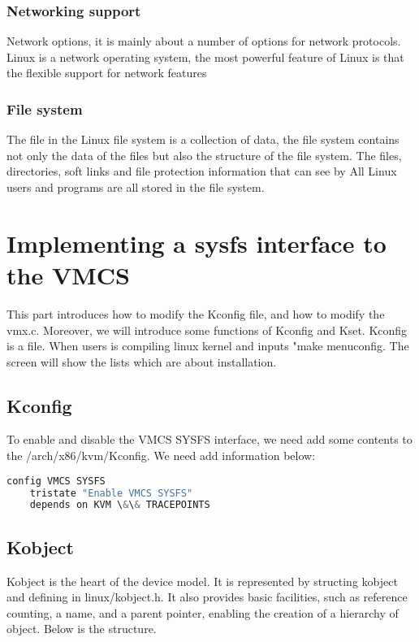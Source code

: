 \documentclass[10pt,draftclsnofoot,peerreview ,letterpaper,onecolumn,]{IEEEtran}
\begin{document}
	\subsubsection{Networking support}
	Network options, it is mainly about a number of options for network protocols. Linux is a network operating system, the most powerful feature of Linux is that the flexible support for network features\\
	
	\subsubsection{File system}
    The file in the Linux file system is a collection of data, the file system contains not only the data of the files but also the structure of the file system. The files, directories, soft links and file protection information that can see by All Linux users and programs are all stored in the file system.\\
	
	\newpage
	\section{Implementing a sysfs interface to the VMCS}
	This part introduces how to modify the Kconfig file, and how to modify the vmx.c. Moreover, we will introduce  some functions of Kconfig and Kset. Kconfig is a file. When users is compiling linux kernel and inputs "make menuconfig. The screen will show the lists which are about installation.
	\subsection{Kconfig}
	To enable and disable the VMCS SYSFS interface, we need add some contents to the /arch/x86/kvm/Kconfig. We need add information below:
	
	
	\begin{lstlisting}[language=C]
	config VMCS SYSFS  
	tristate "Enable VMCS SYSFS"
	depends on KVM \&\& TRACEPOINTS
	\end{lstlisting}
	
	\subsection{Kobject}
	Kobject is the heart of the device model. It is represented by structing kobject and defining in linux/kobject.h. It also provides basic facilities, such as reference counting, a name, and a parent pointer, enabling the creation of a hierarchy of object. Below is the structure.
	
\end{document}
